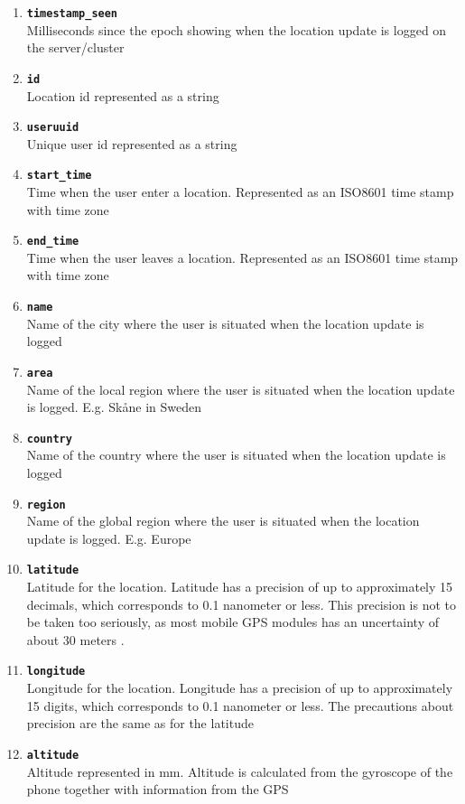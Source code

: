 \begin{enumerate}
\item \texttt{\textbf{timestamp\_seen}}\\Milliseconds since the epoch showing when the location update is logged on the server/cluster 
\item \texttt{\textbf{id}}\\Location id represented as a string  
\item \texttt{\textbf{useruuid}}\\Unique user id represented as a string 
\item \texttt{\textbf{start\_time}}\\Time when the user enter a location. Represented as an ISO8601 time stamp with time zone 
\item \texttt{\textbf{end\_time}}\\Time when the user leaves a location. Represented as an ISO8601 time stamp with time zone
\item \texttt{\textbf{name}}\\Name of the city where the user is situated when the location update is logged 
\item \texttt{\textbf{area}}\\Name of the local region where the user is situated when the location update is logged. E.g. Skåne in Sweden 
\item \texttt{\textbf{country}}\\Name of the country where the user is situated when the location update is logged 
\item \texttt{\textbf{region}}\\Name of the global region where the user is situated when the location update is logged. E.g. Europe
\item \texttt{\textbf{latitude}}\\Latitude for the location. Latitude has a precision of up to approximately 15 decimals, which corresponds to 0.1 nanometer or less. This precision is not to be taken too seriously, as most mobile GPS modules has an uncertainty of about 30 meters   \cite{NAV:8292634}.  
\item \texttt{\textbf{longitude}}\\Longitude for the location. Longitude has a precision of up to approximately 15 digits, which corresponds to 0.1 nanometer or less. The precautions about precision are the same as for the latitude 
\item \texttt{\textbf{altitude}}\\Altitude represented in mm. Altitude is calculated from the gyroscope of the phone together with information from the GPS

\end{enumerate}
